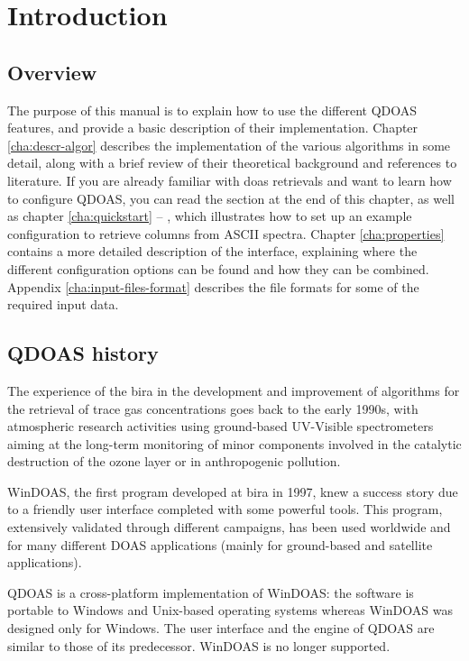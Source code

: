 \chapter{Introduction} \label{cha:intro}
\section{Overview}
The purpose of this manual is to explain how to use the different QDOAS features, and provide a basic description of their implementation.  Chapter \ref{cha:descr-algor} describes the implementation of the various algorithms in some detail, along with a brief review of their theoretical background and references to literature.  If you are already familiar with \acrfull{doas} retrievals and want to learn how to configure QDOAS, you can read the section  at the end of this chapter, as well as chapter \ref{cha:quickstart} -- , which illustrates how to set up an example configuration to retrieve  columns from ASCII spectra.  Chapter \ref{cha:properties} contains a more detailed description of the interface, explaining where the different configuration options can be found and how they can be combined.  Appendix \ref{cha:input-files-format} describes the file formats for some of the required input data.

\section{QDOAS history}
The experience of the \gls{bira} in the development and improvement of algorithms for the retrieval of trace gas concentrations goes back to the early 1990s, with atmospheric research activities using ground-based UV-Visible spectrometers aiming at the long-term monitoring of minor components involved in the catalytic destruction of the ozone layer or in anthropogenic pollution.

WinDOAS, the first program developed at \gls{bira} in 1997, knew a success story due to a friendly user interface completed with some po\-wer\-ful  tools.  This program, extensively validated through different campaigns, has been used worldwide and for many different DOAS applications (mainly for ground-based and satellite applications).

QDOAS is a cross-platform implementation of WinDOAS: the software is portable to Windows and Unix-based operating systems whereas WinDOAS was designed only for Windows. The user interface and the engine of QDOAS are similar to those of its predecessor.  WinDOAS is  no longer supported.

